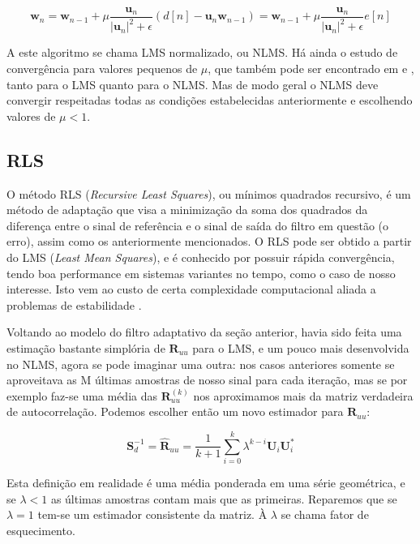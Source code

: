 \begin{equation}
\boldsymbol{w}_{n}=\boldsymbol{w}_{n-1} + \mu \frac{\boldsymbol{u}_{n}}{|\boldsymbol{u}_{n}|^2 + \epsilon }(d[n]-\boldsymbol{u}_{n} \boldsymbol{w}_{n-1}) =\boldsymbol{w}_{n-1} + \mu \frac{\boldsymbol{u}_{n}}{|\boldsymbol{u}_{n}|^2 + \epsilon }e[n]
\end{equation}

A este algoritmo se chama LMS normalizado, ou NLMS. Há ainda o estudo de convergência para valores pequenos de $\mu$, que também pode ser encontrado em \cite{diniz1997adaptive} e \cite{haykin2005adaptive}, tanto para o LMS quanto para o NLMS. Mas de modo geral o NLMS deve convergir respeitadas todas as condições estabelecidas anteriormente e escolhendo valores de $\mu<1$.

\subsection{RLS}

\indent O método RLS (\textit{Recursive Least Squares}), ou mínimos quadrados recursivo, é um método de adaptação que visa a minimização da soma dos quadrados da diferença entre o sinal de referência e o sinal de saída do filtro em questão (o erro), assim como os anteriormente mencionados. O RLS pode ser obtido a partir do LMS (\textit{Least Mean Squares}), e é conhecido por possuir rápida convergência, tendo boa performance em sistemas variantes no tempo, como o caso de nosso interesse. Isto vem ao custo de certa complexidade computacional aliada a problemas de estabilidade \cite{diniz1997adaptive}.

\indent Voltando ao modelo do filtro adaptativo da seção anterior, havia sido feita uma estimação bastante simplória de $\boldsymbol{R}_{uu}$ para o LMS, e um pouco mais desenvolvida no NLMS, agora se pode imaginar uma outra: nos casos anteriores somente se aproveitava as M últimas amostras de nosso sinal para cada iteração, mas se por exemplo faz-se uma média das $\boldsymbol{R}_{uu}^{(k)}$ nos aproximamos mais da matriz verdadeira de autocorrelação. Podemos escolher então um novo estimador para $\boldsymbol{R}_{uu}$:

\begin{equation}
\boldsymbol{S}_{d}^{-1}=\boldsymbol{\hat{R}}_{uu}=\frac{1}{k+1}\sum_{i=0}^{k}\lambda^{k-i}\boldsymbol{U}_i\boldsymbol{U}_i^*
\end{equation}

\indent Esta definição em realidade é uma média ponderada em uma série geométrica, e se $\lambda<1$ as últimas amostras contam mais que as primeiras. Reparemos que se $\lambda=1$ tem-se um estimador consistente da matriz. À $\lambda$ se chama fator de esquecimento.


